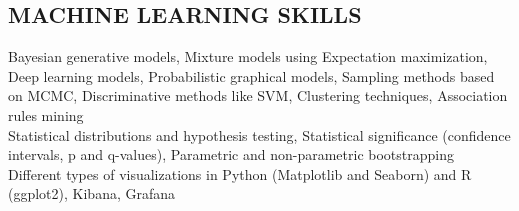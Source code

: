 \documentclass[margin, 10pt]{res} %
\begin{document}
\begin{resume}
\section{MACHINE LEARNING SKILLS}
{\bf \color{Brown}{ML areas:}} 
Bayesian generative models, Mixture models using Expectation maximization, Deep learning models, Probabilistic graphical models, Sampling methods based on MCMC, 
Discriminative methods like SVM, Clustering techniques, Association rules mining   \\
{\bf \color{Brown}{Statistical Theory:}} Statistical distributions and hypothesis testing, Statistical significance (confidence intervals, p and q-values), Parametric and non-parametric bootstrapping \\
{\bf \color{Brown}{Visualization and reporting:}} Different types of visualizations in Python (Matplotlib and Seaborn) and R (ggplot2), Kibana, Grafana



\end{resume}
\end{document}
